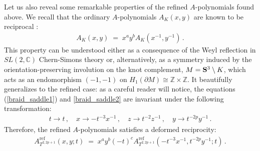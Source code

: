 \documentclass[hyper,letterpaper]{JHEP3}
\newcommand{\Z}{{\mathbb Z}}
\newcommand{\C}{{\mathbb C}}
\begin{document}
Let us also reveal some remarkable properties of the refined $A$-polynomials found above.
We recall that the ordinary $A$-polynomials $A_{K}(x,y)$ are known to be reciprocal \cite{Apol,DGLZ,CCGL}:
\begin{eqnarray}
A_{K} (x,y) \; = \; x^a y^b A_{K} (x^{-1},y^{-1}) \,.
\end{eqnarray}
This property can be understood either as a consequence of the Weyl reflection
in $SL(2,\C)$ Chern-Simons theory or, alternatively, as a symmetry induced by
the orientation-preserving involution on the knot complement, $M = {\bf S}^3 \setminus K$,
which acts as an endomorphism $(-1,-1)$ on $H_1 (\partial M) \cong \Z \times \Z$.
It beautifully generalizes to the refined case: as a careful reader will notice,
the equations (\ref{braid_saddle1}) and \eqref{braid_saddle2} are invariant under the following transformation:
\begin{eqnarray}
t\to t \,, \quad  x\to -t^{-3}x^{-1} \,, \quad z\to t^{-2}z^{-1} \,, \quad  y\to t^{-2p}y^{-1} \,.
\end{eqnarray}
Therefore, the refined $A$-polynomials satisfies a deformed reciprocity:
\begin{eqnarray}
\boxed{\phantom{\int^1}
A^{\text{ref}}_{T^{2,2p+1}}(x,y;t) \; = \; x^a y^b (-t)^c A^{\text{ref}}_{T^{2,2p+1}} (-t^{-3}x^{-1},t^{-2p} y^{-1};t) \,. \phantom{\int^1}}
\label{reciprocity_deform}
\end{eqnarray}
\end{document}
